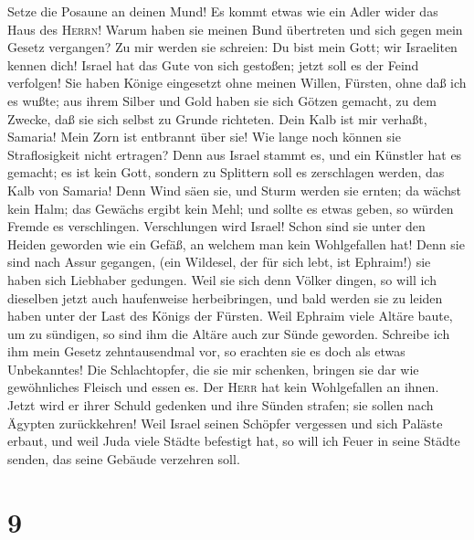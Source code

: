 Setze die Posaune an deinen Mund! Es kommt etwas wie ein
Adler wider das Haus des \textsc{Herrn}! Warum haben sie meinen Bund
übertreten und sich gegen mein Gesetz vergangen?  Zu mir
werden sie schreien: Du bist mein Gott; wir Israeliten kennen dich!
 Israel hat das Gute von sich gestoßen; jetzt soll es der
Feind verfolgen!  Sie haben Könige eingesetzt ohne meinen
Willen, Fürsten, ohne daß ich es wußte; aus ihrem Silber und Gold haben
sie sich Götzen gemacht, zu dem Zwecke, daß sie sich selbst zu Grunde
richteten.  Dein Kalb ist mir verhaßt, Samaria! Mein Zorn
ist entbrannt über sie! Wie lange noch können sie Straflosigkeit nicht
ertragen?  Denn aus Israel stammt es, und ein Künstler hat
es gemacht; es ist kein Gott, sondern zu Splittern soll es zerschlagen
werden, das Kalb von Samaria!  Denn Wind säen sie, und
Sturm werden sie ernten; da wächst kein Halm; das Gewächs ergibt kein
Mehl; und sollte es etwas geben, so würden Fremde es verschlingen.
 Verschlungen wird Israel! Schon sind sie unter den Heiden
geworden wie ein Gefäß, an welchem man kein Wohlgefallen hat!
 Denn sie sind nach Assur gegangen, (ein Wildesel, der für
sich lebt, ist Ephraim!) sie haben sich Liebhaber gedungen.
 Weil sie sich denn Völker dingen, so will ich dieselben
jetzt auch haufenweise herbeibringen, und bald werden sie zu leiden
haben unter der Last des Königs der Fürsten.  Weil
Ephraim viele Altäre baute, um zu sündigen, so sind ihm die Altäre auch
zur Sünde geworden.  Schreibe ich ihm mein Gesetz
zehntausendmal vor, so erachten sie es doch als etwas Unbekanntes!
 Die Schlachtopfer, die sie mir schenken, bringen sie dar
wie gewöhnliches Fleisch und essen es. Der \textsc{Herr} hat kein
Wohlgefallen an ihnen. Jetzt wird er ihrer Schuld gedenken und ihre
Sünden strafen; sie sollen nach Ägypten zurückkehren! 
Weil Israel seinen Schöpfer vergessen und sich Paläste erbaut, und weil
Juda viele Städte befestigt hat, so will ich Feuer in seine Städte
senden, das seine Gebäude verzehren soll.

\hypertarget{section-8}{%
\section{9}\label{section-8}}

